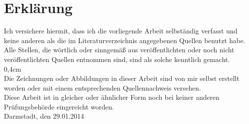 \section*{Erklärung}
\label{erklaerung}
		 
Ich versichere hiermit, dass ich die vorliegende Arbeit selbständig verfasst und
keine anderen als die im Literaturverzeichnis angegebenen Quellen benutzt habe.
\\
Alle Stellen, die wörtlich oder sinngemäß aus veröffentlichten oder noch nicht
veröffentlichten Quellen entnommen sind, sind als solche kenntlich gemacht. \zab
{0,4cm}\\
Die Zeichnungen oder Abbildungen in dieser Arbeit sind
von mir selbst erstellt worden oder mit einem entsprechenden Quellennachweis
versehen. \\
Diese Arbeit ist in gleicher oder ähnlicher Form noch bei keiner anderen
Prüfungsbehörde eingereicht worden. \zab {2cm}\\
Darmstadt, den 29.01.2014 \\

